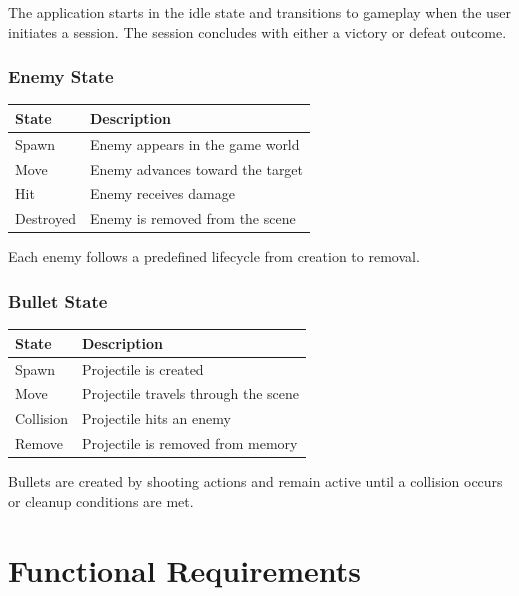\documentclass[11pt,a4paper]{article}
\begin{document}
The application starts in the idle state and transitions to gameplay when the
user initiates a session. The session concludes with either a victory or defeat
outcome.

\subsubsection{Enemy State}

\begin{center}
\begin{tabular}{ll}
  \toprule
  \textbf{State} & \textbf{Description} \\
  \midrule
  Spawn     & Enemy appears in the game world \\
  Move      & Enemy advances toward the target \\
  Hit       & Enemy receives damage \\
  Destroyed & Enemy is removed from the scene \\
  \bottomrule
\end{tabular}
\end{center}

Each enemy follows a predefined lifecycle from creation to removal.

\subsubsection{Bullet State}

\begin{center}
\begin{tabular}{ll}
  \toprule
  \textbf{State} & \textbf{Description} \\
  \midrule
  Spawn     & Projectile is created \\
  Move      & Projectile travels through the scene \\
  Collision & Projectile hits an enemy \\
  Remove    & Projectile is removed from memory \\
  \bottomrule
\end{tabular}
\end{center}

Bullets are created by shooting actions and remain active until a collision
occurs or cleanup conditions are met.

\section{Functional Requirements}
\end{document}
